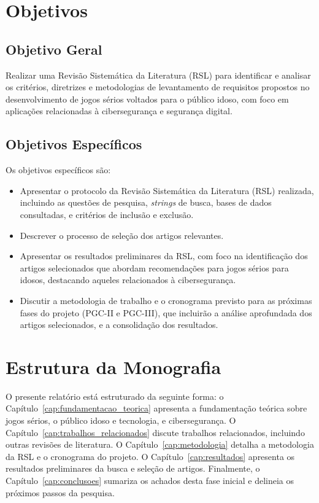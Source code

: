 \section{Objetivos}

\subsection{Objetivo Geral}
Realizar uma Revisão Sistemática da Literatura (RSL) para identificar e analisar os critérios, diretrizes e metodologias de levantamento de requisitos propostos no desenvolvimento de jogos sérios voltados para o público idoso, com foco em aplicações relacionadas à cibersegurança e segurança digital.

\subsection{Objetivos Específicos}
Os objetivos específicos são:
\begin{itemize}
    \item Apresentar o protocolo da Revisão Sistemática da Literatura (RSL) realizada, incluindo as questões de pesquisa, \textit{strings} de busca, bases de dados consultadas, e critérios de inclusão e exclusão.
    \item Descrever o processo de seleção dos artigos relevantes.
    \item Apresentar os resultados preliminares da RSL, com foco na identificação dos artigos selecionados que abordam recomendações para jogos sérios para idosos, destacando aqueles relacionados à cibersegurança.
    \item Discutir a metodologia de trabalho e o cronograma previsto para as próximas fases do projeto (PGC-II e PGC-III), que incluirão a análise aprofundada dos artigos selecionados, e a consolidação dos resultados.
\end{itemize}

\section{Estrutura da Monografia}
O presente relatório está estruturado da seguinte forma: o Capítulo~\ref{cap:fundamentacao_teorica} apresenta a fundamentação teórica sobre jogos sérios, o público idoso e tecnologia, e cibersegurança. O Capítulo~\ref{cap:trabalhos_relacionados} discute trabalhos relacionados, incluindo outras revisões de literatura. O Capítulo~\ref{cap:metodologia} detalha a metodologia da RSL e o cronograma do projeto. O Capítulo~\ref{cap:resultados} apresenta os resultados preliminares da busca e seleção de artigos. Finalmente, o Capítulo~\ref{cap:conclusoes} sumariza os achados desta fase inicial e delineia os próximos passos da pesquisa.





